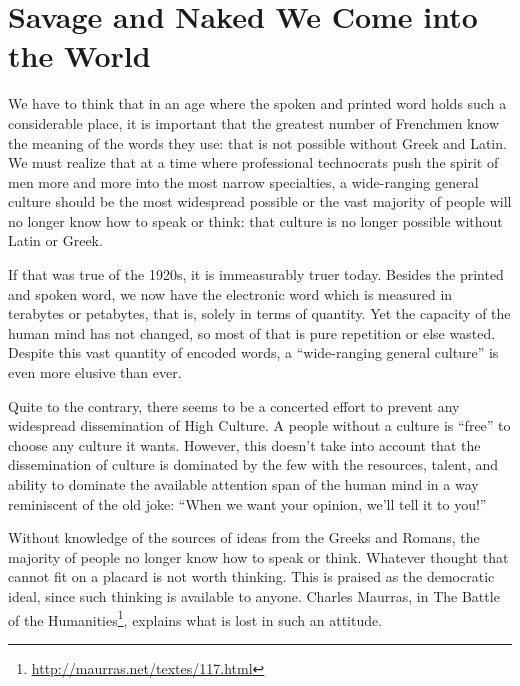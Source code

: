 \section{Savage and Naked We Come into the World}

\begin{quotex}
We have to think that in an age where the spoken and printed word holds such a considerable place, it is important that the greatest number of Frenchmen know the meaning of the words they use: that is not possible without Greek and Latin. We must realize that at a time where professional technocrats push the spirit of men more and more into the most narrow specialties, a wide-ranging general culture should be the most widespread possible or the vast majority of people will no longer know how to speak or think: that culture is no longer possible without Latin or Greek.
\end{quotex}


If that was true of the 1920s, it is immeasurably truer today. Besides the printed and spoken word, we now have the electronic word which is measured in terabytes or petabytes, that is, solely in terms of quantity. Yet the capacity of the human mind has not changed, so most of that is pure repetition or else wasted. Despite this vast quantity of encoded words, a ``wide-ranging general culture'' is even more elusive than ever.

Quite to the contrary, there seems to be a concerted effort to prevent any widespread dissemination of High Culture. A people without a culture is ``free'' to choose any culture it wants. However, this doesn't take into account that the dissemination of culture is dominated by the few with the resources, talent, and ability to dominate the available attention span of the human mind in a way reminiscent of the old joke: ``When we want your opinion, we'll tell it to you!''

Without knowledge of the sources of ideas from the Greeks and Romans, the majority of people no longer know how to speak or think. Whatever thought that cannot fit on a placard is not worth thinking. This is praised as the democratic ideal, since such thinking is available to anyone. Charles Maurras, in The Battle of the Humanities\footnote{\url{http://maurras.net/textes/117.html}}, explains what is lost in such an attitude.

